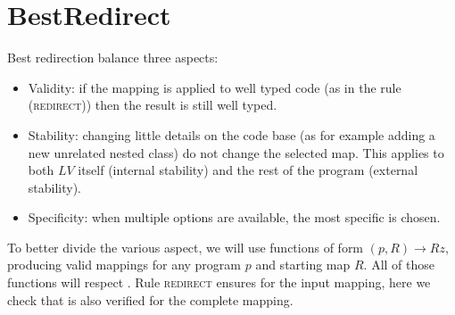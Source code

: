 



\section{BestRedirect}
Best redirection balance three aspects:
\begin{itemize}
\item Validity: if the mapping is applied to well typed code (as in the rule \textsc{(redirect)}) then the result is still well typed.
\item Stability: changing little details on the code base (as for example adding a new unrelated nested class) do not change the selected map.
This applies to both $LV$ itself (internal stability)
and the rest of the program (external stability).
\item Specificity: when multiple options are available, the most specific is chosen.
\end{itemize}

To better divide the various aspect, we will use
functions of form $(p,R)\rightarrow Rz$, producing valid mappings
for any program $p$ and starting map $R$.
All of those functions will respect 
.
Rule \textsc{redirect} ensures 
 for the input mapping,
here we check that is also verified for the complete mapping.


